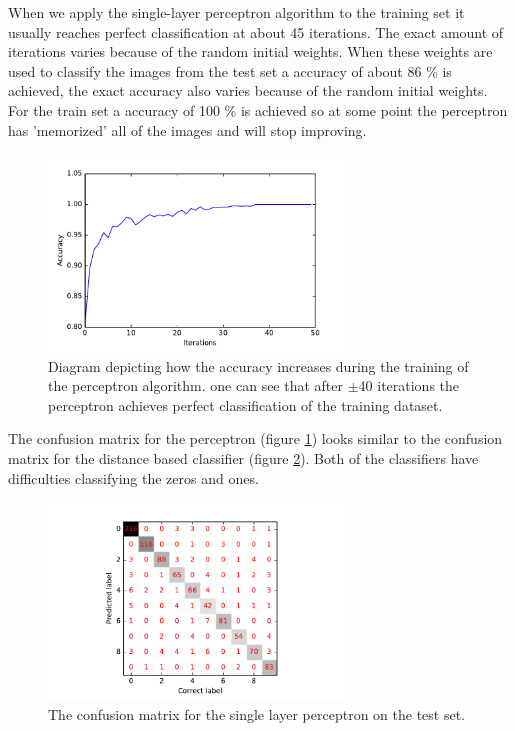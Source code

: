 \documentclass[10 pt, a4paper]{article}
\begin{document}
When we apply the single-layer perceptron algorithm to the training set it usually reaches perfect classification at about 45 iterations. The exact amount of iterations varies because of the random initial weights. When these weights are used to classify the images from the test set a accuracy of about 86 \% is achieved, the exact accuracy also varies because of the random initial weights. For the train set a accuracy of 100 \% is achieved so at some point the perceptron has 'memorized' all of  the images and will stop improving.

\begin{figure}
  \centering
    \includegraphics[width=0.7\textwidth]{perceptron_accuracy}
  \caption{Diagram depicting how the accuracy increases during the training of the perceptron algorithm. one can see that after $\pm 40$ iterations the perceptron achieves perfect classification of the training dataset. }
  \label{fig:percom}
\end{figure}

The confusion matrix for the perceptron (figure \ref{fig:percom}) looks similar to the confusion matrix for the distance based classifier (figure \ref{fig:euccom}). Both of the classifiers have difficulties classifying the zeros and ones.

\begin{figure}[H] 
  \centering
    \includegraphics[width=0.7\textwidth]{perceptronConfusion}
  \caption{The confusion matrix for the single layer perceptron on the test set. }
  \label{fig:euccom}
\end{figure}
\end{document}
